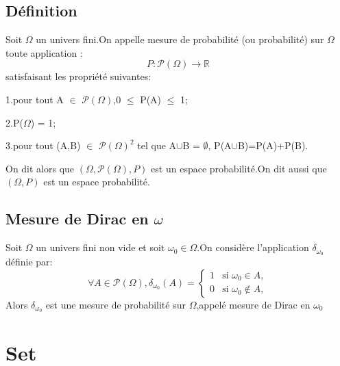 \documentclass[12pt]{book}
\theoremstyle{definition}\newtheorem{dfn}{Définition}[chapter]
\theoremstyle{plain}\newtheorem{thm}{Théorème}[chapter]
\theoremstyle{plain}\newtheorem{prp}{Proposition}[chapter]
\theoremstyle{plain}\newtheorem{lem}{\bf Lemme}[chapter]
\theoremstyle{plain}\newtheorem{axm}{\bf Axiome}[chapter]
\theoremstyle{plain}\newtheorem{lmm}{\bf Lemme}[chapter]
\theoremstyle{plain}\newtheorem{cor}{\bf Corollaire}[chapter]
\theoremstyle{remark}\newtheorem{rem}{Remarque}[chapter]
\begin{document}
\subsection{Définition}
Soit $\varOmega$ un univers fini.On appelle mesure de probabilité (ou probabilité)
sur $\varOmega$ toute application :
\begin{equation*}
P:\mathcal{P(\varOmega)}\longrightarrow\mathbb{R}
\end{equation*}
satisfaisant les propriété suivantes:

1.pour tout A $\in$ $\mathcal{P(\varOmega)}$,0 $\leqslant$ P(A) $\leqslant$ 1;


2.P($\varOmega$) = 1;

3.pour tout (A,B) $\in$ $\mathcal{P(\varOmega)}^2$ tel que A$\cup$B = $\emptyset$, P(A$\cup  $B)=P(A)+P(B).

On dit alors que $(\varOmega,\mathcal{P(\varOmega)},P)$ est un espace probabilité.On dit aussi que $(\varOmega,P)$  est un espace probabilité.
\subsection{Mesure de Dirac en $\omega$}
Soit $\varOmega$ un univers fini non vide et soit $\omega_0 \in \varOmega$.On considère l'application $\delta_{\omega_0}$ définie par:
\begin{equation*}
\forall A \in \mathcal{P(\varOmega)},  \delta_{\omega_0}(A) = \begin{cases}
1 & \text{si }\omega_0 \in A ,\\
0 & \text{si }\omega_0 \notin A ,
\end{cases}
\end{equation*}
Alors $\delta_{\omega_0}$ est une mesure de probabilité sur $\varOmega$,appelé mesure de Dirac en $\omega_0$




\section{Set}
\end{document}
